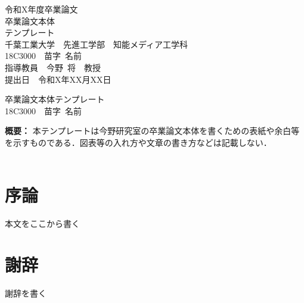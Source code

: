 \documentclass[a4paper,12pt]{ujreport}
\newenvironment{longbox}{%
  \def\FrameCommand{\fboxsep=\FrameSep \fbox}%
  \MakeFramed {\FrameRestore}}%
 {\endMakeFramed}
\begin{document}
%
%
\begin{titlepage}
\begin{center}
{\large 令和X年度卒業論文\\}
 \vspace{3cm}
 {\Huge 卒業論文本体\\テンプレート\\} %
 \vspace{4cm}
{\large%
  千葉工業大学~~先進工学部~~知能メディア工学科\\
\vspace{3mm}18C3000~~苗字~名前\\
\vspace{3cm}指導教員~~今野~将~~教授\\
\vspace{1cm}提出日~~令和X年XX月XX日\\
}
\end{center}
\end{titlepage}

\begin{titlepage}
\begin{longbox}
\begin{center}
 {\Huge 卒業論文本体テンプレート}\\
 {\large%
   \vspace{3mm}%
   18C3000~~苗字~名前\\
 }
\end{center}
{\bf 概要：}%
本テンプレートは今野研究室の卒業論文本体を書くための表紙や余白等を示すものである．図表等の入れ方や文章の書き方などは記載しない．
\\
\\
\end{longbox}
\end{titlepage}

\newpage
\tableofcontents

\newpage
\setcounter{page}{0}
\chapter{序論}\label{chap-序論}
本文をここから書く


\chapter*{謝辞}
\nocite{*}

謝辞を書く


\newpage
{}




\end{document}

